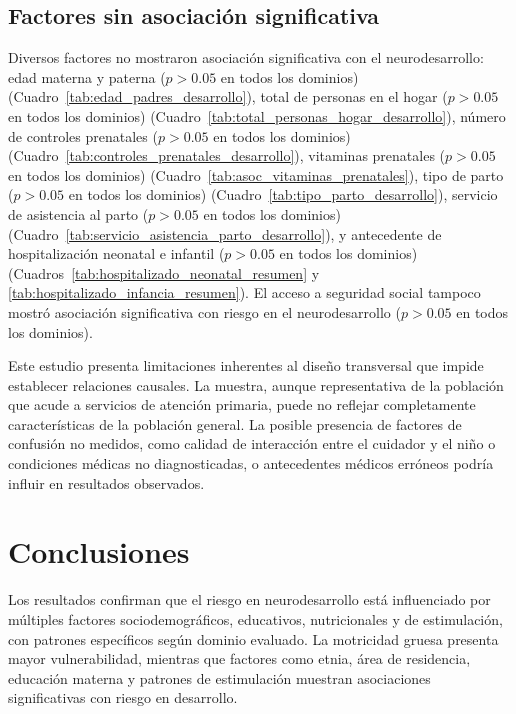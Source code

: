 \documentclass[11pt,letterpaper]{report}
\begin{document}
\subsection{Factores sin asociación significativa}

Diversos factores no mostraron asociación significativa con el neurodesarrollo: 
edad materna y paterna ($p > 0.05$ en todos los dominios) 
(Cuadro~\ref{tab:edad_padres_desarrollo}), total de personas en el hogar 
($p > 0.05$ en todos los dominios) 
(Cuadro~\ref{tab:total_personas_hogar_desarrollo}), número de controles 
prenatales ($p > 0.05$ en todos los dominios) 
(Cuadro~\ref{tab:controles_prenatales_desarrollo}), vitaminas prenatales 
($p > 0.05$ en todos los dominios) (Cuadro~\ref{tab:asoc_vitaminas_prenatales}), 
tipo de parto ($p > 0.05$ en todos los dominios) 
(Cuadro~\ref{tab:tipo_parto_desarrollo}), servicio de asistencia al parto 
($p > 0.05$ en todos los dominios) 
(Cuadro~\ref{tab:servicio_asistencia_parto_desarrollo}), y antecedente de
hospitalización neonatal e infantil ($p > 0.05$ en todos los dominios) 
(Cuadros~\ref{tab:hospitalizado_neonatal_resumen} y 
\ref{tab:hospitalizado_infancia_resumen}). El acceso a seguridad social tampoco
mostró asociación significativa con riesgo en el neurodesarrollo ($p > 0.05$ en
todos los dominios). 

Este estudio presenta limitaciones inherentes al diseño transversal que impide 
establecer relaciones causales. La muestra, aunque representativa de la
población que acude a servicios de atención primaria, puede no reflejar
completamente características de la población general. La posible presencia de
factores de confusión no medidos, como calidad de interacción entre el cuidador
y el niño o condiciones médicas no diagnosticadas, o antecedentes médicos
erróneos podría influir en resultados observados.

\section{Conclusiones}

Los resultados confirman que el riesgo en neurodesarrollo está influenciado 
por múltiples factores sociodemográficos, educativos, nutricionales y de 
estimulación, con patrones específicos según dominio evaluado. La motricidad 
gruesa presenta mayor vulnerabilidad, mientras que factores como etnia, área 
de residencia, educación materna y patrones de estimulación muestran 
asociaciones significativas con riesgo en desarrollo.
\end{document}
